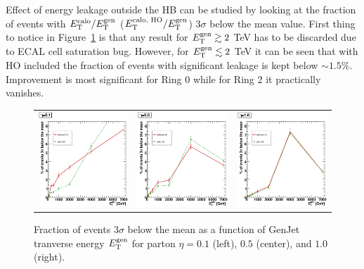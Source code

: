 \documentclass{cmspaper}
\begin{document}
Effect of energy leakage outside the HB can be studied by looking at the fraction of events with $E^\text{calo}_\text T/E^\text{gen}_\text T$ ($E^\text{calo, HO}_\text T/E^\text{gen}_\text T$) $3\sigma$ below the mean value. First thing to notice in Figure~\ref{fig:3sigma} is that any result for $E^\text{gen}_\text T\gtrsim2$ TeV has to be discarded due to ECAL cell saturation bug. However, for $E^\text{gen}_\text T\lesssim2$ TeV it can be seen that with HO included the 
fraction of events with significant leakage is kept below $\sim1.5\%$. Improvement is most significant for Ring $0$ while for Ring $2$ it practically vanishes. 
\begin{figure}
 \centering
 \begin{tabular}{lll}
  \includegraphics[width=2in]{figs/P3sigma_corr_eta0.1.eps} &
  \includegraphics[width=2in]{figs/P3sigma_corr_eta0.5.eps} &
  \includegraphics[width=2in]{figs/P3sigma_corr_eta1.0.eps} \\
 \end{tabular}
 \caption{Fraction of events $3\sigma$ below the mean as a function of GenJet tranverse energy $E^\text{gen}_\text T$ for parton $\eta=0.1$ (left), $0.5$ (center), and $1.0$ (right).}
 \label{fig:3sigma}
\end{figure}
\end{document}
